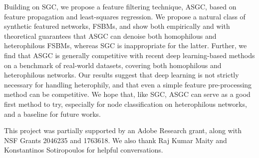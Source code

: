\documentclass{article}
\begin{document}
Building on SGC, we propose a feature filtering technique, ASGC, based on feature propagation and least-squares regression. We propose a natural class of synthetic featured networks, FSBMs, and show both empirically and with theoretical guarantees that ASGC can denoise both homophilous and heterophilous FSBMs, whereas SGC is inappropriate for the latter. Further, we find that ASGC is generally competitive with recent deep learning-based methods on a benchmark of real-world datasets, covering both homophilous and heterophilous networks. Our results suggest that deep learning is not strictly necessary for handling heterophily, and that even a simple feature pre-processing method can be competitive. We hope that, like SGC, ASGC can serve as a good first method to try, especially for node classification on heterophilous networks, and a baseline for future works.



\begin{ack}
This project was partially supported by an Adobe Research grant, along with NSF
Grants 2046235 and 1763618. We also thank Raj Kumar Maity and Konstantinos Sotiropoulos for helpful conversations.
\end{ack}
\end{document}
